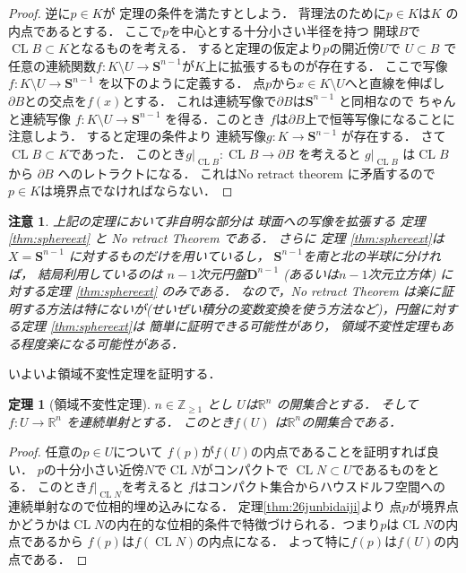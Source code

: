 \documentclass[leqno, a4paper, 12pt]{jsarticle}
\newtheorem{thm}{定理}
\newtheorem*{rmk}{注意}
\newcommand{\zz}{\mathbb{Z}}
\newcommand{\rr}{\mathbb{R}}
\DeclareMathOperator{\cl}{CL}
\newcommand{\mydisc}[1]{\mathbf{D}^{#1}}
\newcommand{\mysphere}[1]{\mathbf{S}^{#1}}
\numberwithin{equation}{section}
\begin{document}
\begin{proof}
逆に$p\in K$が
定理の条件を満たすとしよう．
背理法のために$p\in K$は$K$
の内点であるとする．
ここで$p$を中心とする十分小さい半径を持つ
開球$B$で$\cl B\subset K$となるものを考える．
すると定理の仮定より$p$の開近傍$U$で
$U\subset B$
で任意の連続関数$f\colon K\setminus U\to \mysphere{n-1}$が$K$上に拡張するものが存在する．
ここで写像
$f\colon K\setminus U\to \mysphere{n-1}$
を以下のように定義する．
点$p$から$x\in K\setminus U$へと直線を伸ばし
$\partial B$との交点を$f(x)$とする．
これは連続写像で$\partial B$は$\mysphere{n-1}$
と同相なので
ちゃんと連続写像
$f\colon K\setminus U\to \mysphere{n-1}$
を得る．このとき
$f$は$\partial B$上で恒等写像になることに注意しよう．
すると定理の条件より
連続写像$g\colon K\to \mysphere{n-1}$
が存在する．
さて$\cl B\subset K$であった．
このとき$g|_{\cl B}\colon \cl B\to \partial B$
を考えると
$g|_{\cl B}$
は$\cl B$から
$\partial B$
へのレトラクトになる．
これはNo retract theorem に矛盾するので
$p\in K$は境界点でなければならない．
\end{proof}

\begin{rmk}
上記の定理において非自明な部分は
球面への写像を拡張する
定理
\ref{thm:sphereext}
と
No retract Theorem である．
さらに
定理
\ref{thm:sphereext}は
$X=\mysphere{n-1}$
に対するものだけを用いているし，
$\mysphere{n-1}$を南と北の半球に分ければ，
結局利用しているのは
$n-1$次元円盤$\mydisc{n-1}$
(あるいは$n-1$次元立方体)
に対する定理
\ref{thm:sphereext}
のみである．
なので，No retract Theorem は楽に証明する方法は特にないが(せいぜい積分の変数変換を使う方法など)，円盤に対する定理
\ref{thm:sphereext}は
簡単に証明できる可能性があり，
領域不変性定理もある程度楽になる可能性がある．
\end{rmk}


いよいよ領域不変性定理を証明する．
\begin{thm}[領域不変性定理]\label{thm:maininvdomain}
$n\in \zz_{\ge 1}$
とし
$U$は$\rr^{n}$
の開集合とする．
そして
$f\colon U\to \rr^{n}$
を連続単射とする．
このとき$f(U)$
は$\rr^{n}$の開集合である．
\end{thm}
\begin{proof}
任意の$p\in U$について
$f(p)$が$f(U)$の内点であることを証明すれば良い．
$p$の十分小さい近傍$N$で$\cl N$がコンパクトで
$\cl N \subset U$であるものをとる．
このとき$f|_{\cl N}$を考えると
$f$はコンパクト集合からハウスドルフ空間への
連続単射なので位相的埋め込みになる．
定理\ref{thm:26junbidaiji}より
点$p$が境界点かどうかは$\cl N$の内在的な位相的条件で特徴づけられる．つまり$p$は$\cl N$の内点であるから
$f(p)$は$f(\cl N)$の内点になる．
よって特に$f(p)$は$f(U)$の内点である．
\end{proof}
\end{document}
